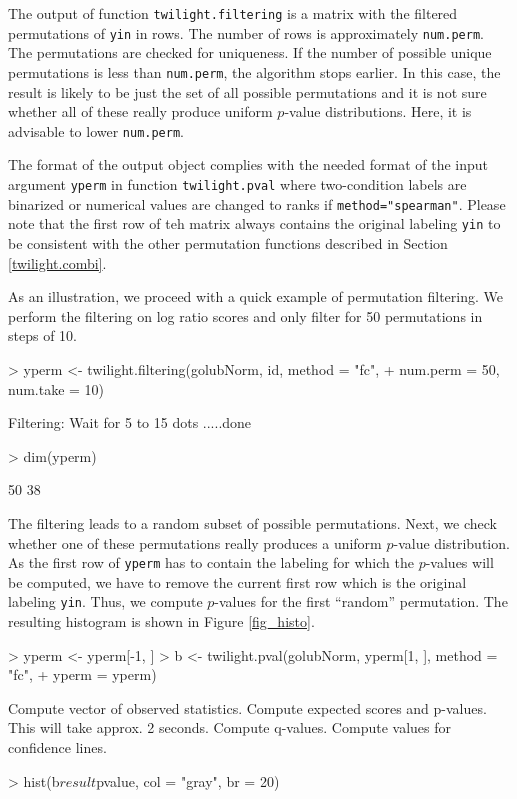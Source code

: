 \documentclass[11pt,a4paper,fleqn]{report}
\newcommand{\Rfunction}[1]{{\texttt{#1}}}
\newcommand{\Rfunarg}[1]{{\texttt{#1}}}
\begin{document}
The output of function \Rfunction{twilight.filtering} is a matrix with the filtered permutations of \Rfunarg{yin} in rows. The number of rows is approximately \Rfunarg{num.perm}. The permutations are checked for uniqueness. If the number of possible unique permutations is less than \Rfunarg{num.perm}, the algorithm stops earlier. In this case, the result is likely to be just the set of all possible permutations and it is not sure whether all of these really produce uniform $p$-value distributions. Here, it is advisable to lower \Rfunarg{num.perm}.

The format of the output object complies with the needed format of the input argument \Rfunarg{yperm} in function \Rfunction{twilight.pval} where two-condition labels are binarized or numerical values are changed to ranks if \Rfunarg{method="spearman"}. Please note that the first row of teh matrix always contains the original labeling \Rfunarg{yin} to be consistent with the other permutation functions described in Section \ref{twilight.combi}.
       
As an illustration, we proceed with a quick example of permutation filtering. We perform the filtering on log ratio scores and only filter for 50 permutations in steps of 10.

\begin{Schunk}
\begin{Sinput}
> yperm <- twilight.filtering(golubNorm, id, method = "fc", 
+     num.perm = 50, num.take = 10)
\end{Sinput}
\begin{Soutput}
Filtering: Wait for 5 to 15 dots .....done
\end{Soutput}
\begin{Sinput}
> dim(yperm)
\end{Sinput}
\begin{Soutput}
[1] 50 38
\end{Soutput}
\end{Schunk}

The filtering leads to a random subset of possible permutations. Next, we check whether one of these permutations really produces a uniform $p$-value distribution. As the first row of \Rfunarg{yperm} has to contain the labeling for which the $p$-values will be computed, we have to remove the current first row which is the original labeling \Rfunarg{yin}. Thus, we compute $p$-values for the first ``random'' permutation. The resulting histogram is shown in Figure \ref{fig_histo}.

\begin{Schunk}
\begin{Sinput}
> yperm <- yperm[-1, ]
> b <- twilight.pval(golubNorm, yperm[1, ], method = "fc", 
+     yperm = yperm)
\end{Sinput}
\begin{Soutput}
Compute vector of observed statistics. 
Compute expected scores and p-values. This will take approx. 2 seconds. 
Compute q-values. 
Compute values for confidence lines. 
\end{Soutput}
\begin{Sinput}
> hist(b$result$pvalue, col = "gray", br = 20)
\end{Sinput}
\end{Schunk}
\end{document}
